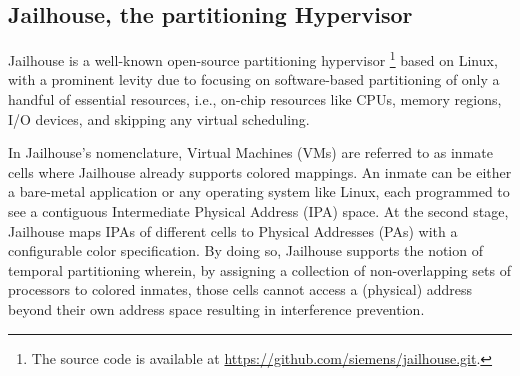 

\subsection{Jailhouse, the partitioning Hypervisor}
Jailhouse is a well-known open-source partitioning
hypervisor \footnote{The source code is available at
  \url{https://github.com/siemens/jailhouse.git}.} based on Linux,
with a prominent levity due to focusing on software-based partitioning
of only a handful of essential resources, i.e., on-chip resources like
CPUs, memory regions, I/O devices, and skipping any virtual
scheduling.

In Jailhouse's nomenclature, Virtual Machines (VMs) are referred to as
inmate cells where Jailhouse already supports colored mappings. An
inmate can be either a bare-metal application or any operating system
like Linux, each programmed to see a contiguous Intermediate Physical
Address (IPA) space. At the second stage, Jailhouse maps IPAs of
different cells to Physical Addresses (PAs) with a configurable color
specification. By doing so, Jailhouse supports the notion of temporal
partitioning wherein, by assigning a collection of non-overlapping
sets of processors to colored inmates, those cells cannot access a
(physical) address beyond their own address space resulting in
interference prevention.


